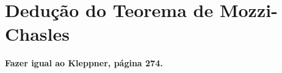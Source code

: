 



\section{Dedução do Teorema de Mozzi-Chasles}
\label{Sec:DeducaoTeoremaDeMozziChasles}

\textbf{Fazer igual ao Kleppner, página 274.}


